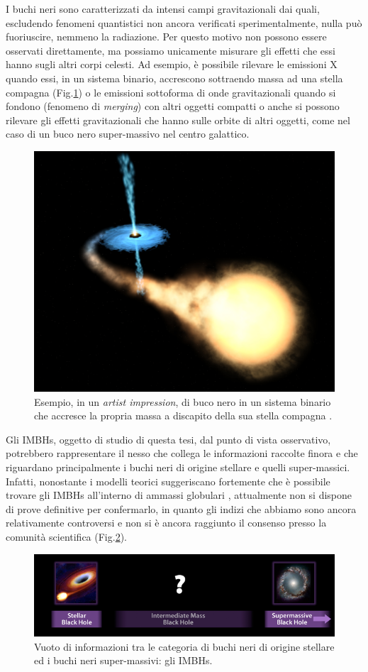 I buchi neri sono caratterizzati da intensi campi gravitazionali dai quali, escludendo fenomeni quantistici non ancora verificati sperimentalmente, nulla può fuoriuscire, nemmeno la radiazione. Per questo motivo non possono essere osservati direttamente, ma possiamo unicamente misurare gli effetti che essi hanno sugli altri corpi celesti. Ad esempio, è possibile rilevare le emissioni X quando essi, in un sistema binario, accrescono sottraendo massa ad una stella compagna (Fig.\ref{fig:binario}) o le emissioni sottoforma di onde gravitazionali quando si fondono (fenomeno di \textit{merging}) con altri oggetti compatti o anche si possono rilevare gli effetti gravitazionali che hanno sulle orbite di altri oggetti, come nel caso di un buco nero super-massivo nel centro galattico.
\begin{figure}
\begin{center}
\includegraphics[width=0.4\columnwidth]{images/Accretion_disk.jpg}
\end{center}
\caption{Esempio, in un \textit{artist impression}, di buco nero in un sistema binario che accresce la propria massa a discapito della sua stella compagna \cite{binaria:online}.}
\label{fig:binario}
\end{figure}

Gli IMBHs, oggetto di studio di questa tesi, dal punto di vista osservativo, potrebbero rappresentare il nesso che collega le informazioni raccolte finora e che riguardano principalmente i buchi neri di origine stellare e quelli super-massici. Infatti, nonostante i modelli teorici suggeriscano fortemente che è possibile trovare gli IMBHs all'interno di ammassi globulari \cite{milham:paper}, attualmente non si dispone di prove definitive per confermarlo, in quanto gli indizi che abbiamo sono ancora relativamente controversi e non si è ancora raggiunto il consenso presso la comunità scientifica (Fig.\ref{fig:imbh_gap}).
\begin{figure}[H]
\begin{center}
\includegraphics[width=0.7\columnwidth]{images/IMBH_gap.png}
\end{center}
\caption{Vuoto di informazioni tra le categoria di buchi neri di origine stellare ed i buchi neri super-massivi: gli IMBHs.}
\label{fig:imbh_gap}
\end{figure}

